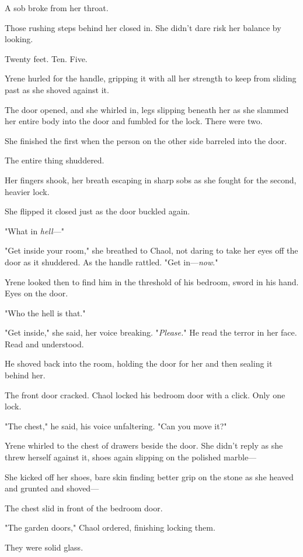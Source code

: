 A sob broke from her throat.

Those rushing steps behind her closed in. She didn't dare risk her balance by looking.

Twenty feet. Ten. Five.

Yrene hurled for the handle, gripping it with all her strength to keep from sliding past as she shoved against it.

The door opened, and she whirled in, legs slipping beneath her as she slammed her entire body into the door and fumbled for the lock. There were two.

She finished the first when the person on the other side barreled into the door.

The entire thing shuddered.

Her fingers shook, her breath escaping in sharp sobs as she fought for the second, heavier lock.

She flipped it closed just as the door buckled again.

"What in \emph{hell}---"

"Get inside your room," she breathed to Chaol, not daring to take her eyes off the door as it shuddered. As the handle rattled. "Get in---\emph{now}."

Yrene looked then to find him in the threshold of his bedroom, sword in his hand. Eyes on the door.

"Who the hell is that."

"Get inside," she said, her voice breaking. "\emph{Please.}" He read the terror in her face. Read and understood.

He shoved back into the room, holding the door for her and then sealing it behind her.

The front door cracked. Chaol locked his bedroom door with a click. Only one lock.

"The chest," he said, his voice unfaltering. "Can you move it?"

Yrene whirled to the chest of drawers beside the door. She didn't reply as she threw herself against it, shoes again slipping on the polished marble---

She kicked off her shoes, bare skin finding better grip on the stone as she heaved and grunted and shoved---

The chest slid in front of the bedroom door.

"The garden doors," Chaol ordered, finishing locking them.

They were solid glass.

